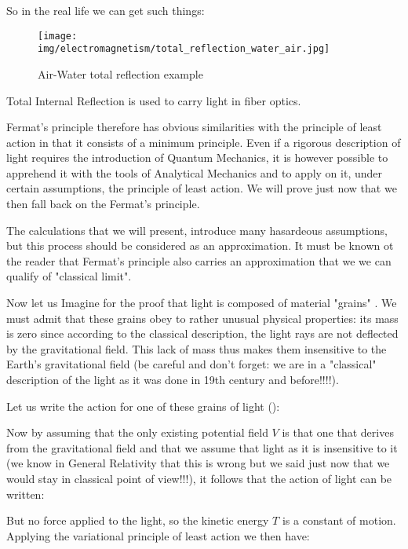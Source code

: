 	So in the real life we can get such things:
	\begin{figure}[H]
		\centering
		\texttt{[image: img/electromagnetism/total\_reflection\_water\_air.jpg]}
		\caption[]{Air-Water total reflection example}
	\end{figure}
	\begin{tcolorbox}[title=Remark,colframe=black,arc=10pt]
	Total Internal Reflection is used to carry light in fiber optics.
	\end{tcolorbox}
	Fermat's principle therefore has obvious similarities with the principle of least action in that it consists of a minimum principle. Even if a rigorous description of light requires the introduction of Quantum Mechanics, it is however possible to apprehend it with the tools of Analytical Mechanics and to apply on it, under certain assumptions, the principle of least action. We will prove just now that we then fall back on the Fermat's principle.

	The calculations that we will present, introduce many hasardeous assumptions, but this process should be considered as an approximation. It must be known ot the reader that Fermat's principle also carries an approximation that we we can qualify of "classical limit".
	
	Now let us Imagine for the proof that light is composed of material "grains" . We must admit that these grains obey to rather unusual physical properties: its mass is zero since according to the classical description, the light rays are not deflected by the gravitational field. This lack of mass thus makes them insensitive to the Earth's gravitational field (be careful and don't forget: we are in a "classical" description of the light as it was done in 19th century and before!!!!).

	Let us write the action for one of these grains of light ():
	
	Now by assuming that the only existing potential field $V$ is that one that derives from the gravitational field and that we assume that light as it is insensitive to it (we know in General Relativity that this is wrong but we said just now that we would stay in classical point of view!!!), it follows that the action of light can be written:
	
	But no force applied to the light, so the kinetic energy $T$ is a constant of motion. Applying  the variational principle of least action we then have:
	
